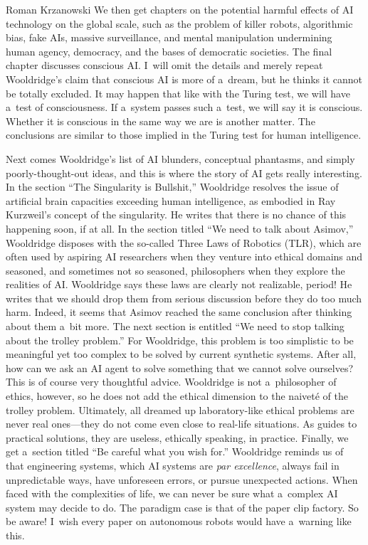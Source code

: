 \begin{newrevengenv}{Roman Krzanowski}
We then get chapters
\parencite[][pp.237–303]{wooldridge_road_2021}
on the potential harmful effects of AI technology on the global scale, such as the problem of killer robots, algorithmic bias, fake AIs, massive surveillance, and mental manipulation undermining human agency, democracy, and the bases of democratic societies. The final chapter discusses conscious AI. I~will omit the details and merely repeat Wooldridge’s claim that conscious AI is more of a~dream, but he thinks it cannot be totally excluded. It may happen that like with the Turing test, we will have a~test of consciousness. If a~system passes such a~test, we will say it is conscious. Whether it is conscious in the same way we are is another matter. The conclusions are similar to those implied in the Turing test for human intelligence.

Next comes Wooldridge’s list of AI blunders, conceptual phantasms, and simply poorly-thought-out ideas, and this is where the story of AI gets really interesting. In the section ``The Singularity is Bullshit,'' Wooldridge resolves the issue of artificial brain capacities exceeding human intelligence, as embodied in Ray Kurzweil’s concept of the singularity. He writes that there is no chance of this happening soon, if at all. In the section titled ``We need to talk about Asimov,'' Wooldridge disposes with the so-called Three Laws of Robotics (TLR), which are often used by aspiring AI researchers when they venture into ethical domains and seasoned, and sometimes not so seasoned, philosophers when they explore the realities of AI. Wooldridge says these laws are clearly not realizable, period! He writes that we should drop them from serious discussion before they do too much harm. Indeed, it seems that Asimov reached the same conclusion after thinking about them a~bit more. The next section is entitled ``We need to stop talking about the trolley problem.'' For Wooldridge, this problem is too simplistic to be meaningful yet too complex to be solved by current synthetic systems. After all, how can we ask an AI agent to solve something that we cannot solve ourselves? This is of course very thoughtful advice. Wooldridge is not a~philosopher of ethics, however, so he does not add the ethical dimension to the naiveté of the trolley problem. Ultimately, all dreamed up laboratory-like ethical problems are never real ones—they do not come even close to real-life situations. As guides to practical solutions, they are useless, ethically speaking, in practice. Finally, we get a~section titled ``Be careful what you wish for.'' Wooldridge reminds us of that engineering systems, which AI systems are \textit{par excellence}, always fail in unpredictable ways, have unforeseen errors, or pursue unexpected actions. When faced with the complexities of life, we can never be sure what a~complex AI system may decide to do. The paradigm case is that of the paper clip factory. So be aware! I~wish every paper on autonomous robots would have a~warning like this.


\end{newrevengenv}
